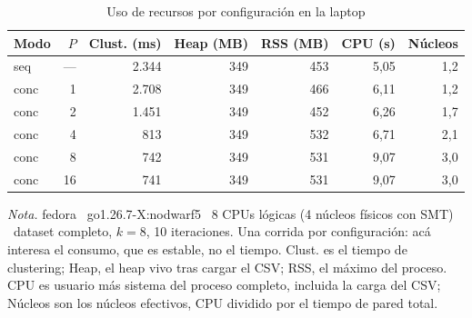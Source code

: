 \begin{table}[H]
\caption{Uso de recursos por configuración en la laptop}\label{tab:recursos}
\footnotesize
\begin{tabular}{@{}lrrrrrr@{}}
\toprule
\textbf{Modo} & \textbf{$P$} & \textbf{Clust. (ms)} & \textbf{Heap (MB)} & \textbf{RSS (MB)} & \textbf{CPU (s)} & \textbf{Núcleos} \\
\midrule
seq & --- & 2.344 & 349 & 453 & 5,05 & 1,2 \\
conc & 1 & 2.708 & 349 & 466 & 6,11 & 1,2 \\
conc & 2 & 1.451 & 349 & 452 & 6,26 & 1,7 \\
conc & 4 & 813 & 349 & 532 & 6,71 & 2,1 \\
conc & 8 & 742 & 349 & 531 & 9,07 & 3,0 \\
conc & 16 & 741 & 349 & 531 & 9,07 & 3,0 \\
\bottomrule
\end{tabular}

{\footnotesize\textit{Nota.} fedora \textperiodcentered\ go1.26.7-X:nodwarf5 \textperiodcentered\ 8 CPUs lógicas (4 núcleos físicos con SMT) \textperiodcentered\ dataset completo, $k=8$, 10 iteraciones. Una corrida por configuración: acá interesa el consumo, que es estable, no el tiempo. Clust. es el tiempo de clustering; Heap, el heap vivo tras cargar el CSV; RSS, el máximo del proceso. CPU es usuario más sistema del proceso completo, incluida la carga del CSV; Núcleos son los núcleos efectivos, CPU dividido por el tiempo de pared total.\par}
\end{table}

